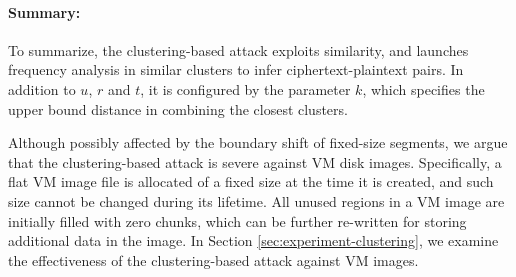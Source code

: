 \documentclass[bachelor]{thesis-uestc}
\begin{document}


\paragraph{Summary:}
To summarize, the clustering-based attack exploits similarity, and launches frequency analysis in similar clusters to infer ciphertext-plaintext pairs. In addition to  $u$, $r$ and $t$, it is configured by the parameter $k$, which specifies the upper bound distance in combining the closest clusters.   

Although possibly affected by the boundary shift of fixed-size segments, we argue that the clustering-based attack is severe against VM disk images. 
Specifically, a flat VM image file is allocated of a fixed size at the time it is created, and such size cannot be changed during its lifetime. All unused regions in a VM image are initially filled with  zero chunks, which can be further re-written for storing additional data in the image. 
In Section \ref{sec:experiment-clustering}, we examine the effectiveness of the clustering-based attack against VM images.

     
\end{document}
